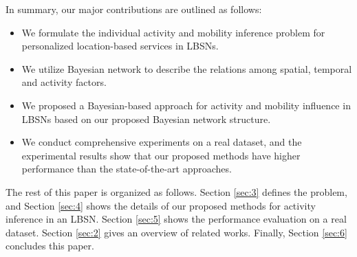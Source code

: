 In summary, our major contributions are outlined as follows:
\begin{itemize}
\item We formulate the individual activity and mobility inference problem for personalized location-based services in LBSNs.
\item We utilize Bayesian network to describe the relations among spatial, temporal and activity factors.
\item We proposed a Bayesian-based approach for activity and mobility influence in LBSNs based on our proposed Bayesian network structure.
\item We conduct comprehensive experiments on a real dataset, and the experimental results show that our proposed methods have higher performance than the state-of-the-art approaches.
\end{itemize}


The rest of this paper is organized as follows. Section \ref{sec:3} defines the problem, and Section \ref{sec:4} shows the details of our proposed methods for activity inference in an LBSN. Section \ref{sec:5} shows the performance evaluation on a real dataset. Section \ref{sec:2} gives an overview of related works. Finally, Section \ref{sec:6} concludes this paper.
